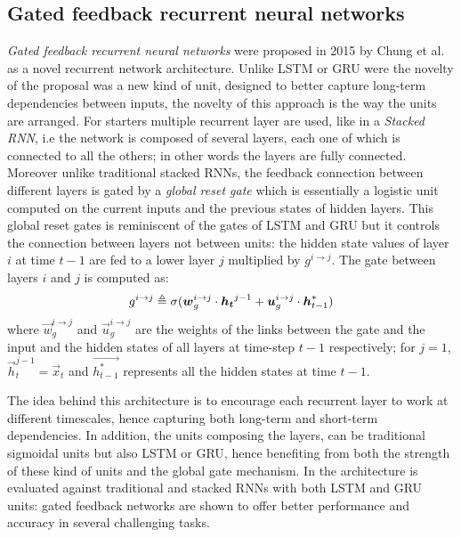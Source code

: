 \subsection{Gated feedback recurrent neural networks}

\textit{Gated feedback recurrent neural networks} were proposed in 2015 by  Chung et al. \cite{gatedFeedback} as a novel recurrent network architecture.
Unlike LSTM or GRU were the novelty of the proposal was a new kind of unit, designed to better capture long-term dependencies between inputs, the novelty of this approach is the way the units are arranged. For starters multiple recurrent layer are used, like in a \textit{Stacked RNN}, i.e the network is composed of several layers, each one of which is connected to all the others; in other words the layers are fully connected. Moreover unlike traditional stacked RNNs, the feedback connection between different layers is gated by a \textit{global reset gate} which is essentially a logistic unit computed on the current inputs and the previous states of hidden layers. This global reset gates is reminiscent of the gates of LSTM and GRU but it controls the connection between layers not between units: the hidden state values of layer $i$ at time $t-1$ are fed to a lower layer $j$ multiplied by $g^{i\rightarrow j}$.
The gate between layers $i$ and $j$ is computed as:
\begin{equation}
g^{i\rightarrow j} \triangleq \sigma(\boldsymbol{w}_g^{i\rightarrow j} \cdot \boldsymbol{h_t}^{j-1} + \boldsymbol{u}_g^{i\rightarrow j} \cdot \boldsymbol{h}^*_{t-1})
\end{equation}
where $\vec{w}_g^{i\rightarrow j}$ and $\vec{u}_g^{i\rightarrow j}$ are the weights of the links between the gate and the input and the hidden states of all layers at time-step $t-1$ respectively; for $j=1$,  $\vec{h}_t^{j-1}=\vec{x}_t $  and $\vec{h^*_{t-1}}$ represents all the hidden states at time $t-1$.

The idea behind this architecture is to encourage each recurrent layer to work at different timescales, hence capturing both long-term and short-term dependencies. In addition, the units composing the layers, can be traditional sigmoidal units but also LSTM or GRU, hence benefiting from both the strength of these kind of units and the global gate mechanism. In \cite{gatedFeedback} the architecture is evaluated against traditional and stacked RNNs with both LSTM and GRU units: gated feedback networks are shown to offer better performance and accuracy in several challenging tasks.


